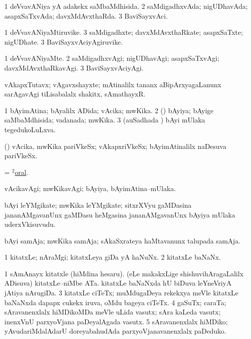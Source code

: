 \bentry
{}
\gl{\gu}
\bmng
\bnum
\num{1} deVvavANiya yA adakekx saMbaMdhisida. 
\num{2} saMdigadhxvAda; nigUDhavAda; asapxSaTxvAda; davxMdAvxthaRda. 
\num{3} BaviSayxvAci. 
\enum
\emng
\eentry

\bentry
{}
\gl{\nA}
\bmng
\bnum
\num{1} deVvavANiyaMtiruvike. 
\num{3} saMdigadhxte; davxMdAvxthaRkate; asapxSaTxte; nigUDhate. 
\num{3} BaviSayxvAciyAgiruvike. 
\enum
\emng
\eentry

\bentry
{}
\gl{\kirxvi}
\bmng
\bnum
\num{1} deVvavANiyaMte. 
\num{2} saMdigadhxvAgi; nigUDhavAgi; asapxSaTxvAgi; davxMdAvxthaRkavAgi. 
\num{3} BaviSayxvAciyAgi. 
\enum
\emng
\eentry

\bentry
{}
\gl{\nA}
\bmng
vAkapxTutavx; vAgavxshayxte; mAtinalilx tananx aBipArxyagaLanunx sarAgavAgi tiLisabalalx shakitx, sAmathayxR. 
\emng
\eentry

\bentry
{}
\gl{\gu}
\bmng
\bnum
\num{1} bAyimAtina; bAyalilx ADida; vAcika; mwKika. 
\num{2} (\aMrashA) bAyiya; bAyige saMbaMdhisida; vadanada; mwKika. 
\num{3} (auSadhada \vi) bAyi mUlaka tegedukoLuLxva. 
\enum
\emng
\eentry

\bentry
{}
\gl{\nA}
\bmng
(\AmA) vAcika, mwKika pariVkeSx; vAkapxriVkeSx; bAyimAtinalilx naDesuva pariVkeSx. 
\emng
\eentry

\bentry
{}
\gl{\nA}
\bmng
= \hyperlink{oral(2)}{$^2$oral}. 
\emng
\eentry

\bentry
{}
\gl{\kirxvi}
\bmng
vAcikavAgi; mwKikavAgi; bAyiya, bAyimAtina--mUlaka. 
\emng
\eentry

\bentry
{}
\gl{\nA}
\bmng
bAyi leYMgikate; mwKika leYMgikate; sitxrXVyu gaMDasina jananAMgavanUnx gaMDasu heMgasina jananAMgavanUnx bAyiya mUlaka uderxVkisuvudu. 
\emng
\eentry

\bentry
{}
\gl{\nA}
\bmng
bAyi samAja; mwKika samAja; sAkaSxrateya haMtavanunx talupada samAja. 
\emng
\eentry

\bentry
{}
\gl{\nA}
\bmng
\bnum
\num{1} kitatxLe; nAraMgi; kitatxLeya giDa yA haNuNx. 
\num{2} kitatxLe baNaNx. 
\enum
\emng

\noindent
\gl{\pagu}
\bmng
\bnum
\num{1}  sAmAnayx kitatxle (hiMdina hesaru). 
  
\banum
{} (eLe makakxLige shishuvihAragaLalilx ADisuva) kitatxLe--niMbe ATa. 
 kitatxLe baNaNxda hU biDuva leYneVriyA jAtiya nArugiDa. 
\eanum
\numie
\num{3}  kitatxLe ciTeTx; muMdugaDeya rekekxya meVle kitatxLe baNaNxda dapapx cukekx iruva, oMdu bageya ciTeTx. 
\num{4}  gaSuTx; caraTa; sAravanenxlalx hiMDikoMDa meVle uLida vasutx; sAra kaLeda vasutx; inenxVnU parxyoVjana paDeyalAgada vasutx. 
\num{5}  sAravanenxlalx hiMDiko; yAvudariMdalAdarU doreyabahudAda parxyoVjanavanenxlalx paDeduko. 
\enum
\emng
\eentry

